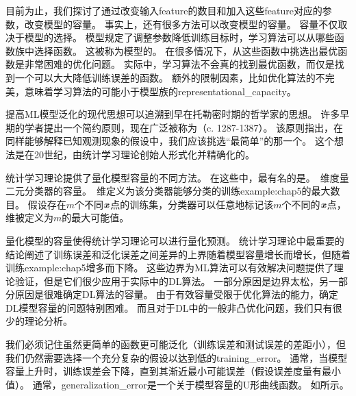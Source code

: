 
目前为止，我们探讨了通过改变输入\gls{feature}的数目和加入这些\gls{feature}对应的参数，改变模型的容量。
事实上，还有很多方法可以改变模型的容量。
容量不仅取决于模型的选择。
模型规定了调整参数降低训练目标时，学习算法可以从哪些函数族中选择函数。
这被称为模型的。
在很多情况下，从这些函数中挑选出最优函数是非常困难的优化问题。
实际中，学习算法不会真的找到最优函数，而仅是找到一个可以大大降低训练误差的函数。
额外的限制因素，比如优化算法的不完美，意味着学习算法的可能小于模型族的\gls{representational_capacity}。


提高\gls{ML}模型泛化的现代思想可以追溯到早在托勒密时期的哲学家的思想。
许多早期的学者提出一个简约原则，现在广泛被称为（c. 1287-1387）。
该原则指出，在同样能够解释已知观测现象的假设中，我们应该挑选``最简单''的那一个。
这个想法是在20世纪，由统计学习理论创始人形式化并精确化的\citep{Vapnik71,Vapnik82,Blumer-et-al-1989,Vapnik95}。

统计学习理论提供了量化模型容量的不同方法。
在这些中，最有名的是。
\,维度量二元分类器的容量。
\,维定义为该分类器能够分类的训练\gls{example:chap5}的最大数目。
假设存在$m$个不同$\boldsymbol{\mathit{x}}$点的训练集，分类器可以任意地标记该$m$个不同的$\boldsymbol{\mathit{x}}$点，\,维被定义为$m$的最大可能值。

量化模型的容量使得统计学习理论可以进行量化预测。
统计学习理论中最重要的结论阐述了训练误差和泛化误差之间差异的上界随着模型容量增长而增长，但随着训练\gls{example:chap5}增多而下降\citep{Vapnik71,Vapnik82,Blumer-et-al-1989,Vapnik95}。
这些边界为\gls{ML}算法可以有效解决问题提供了理论验证，但是它们很少应用于实际中的\gls{DL}算法。
一部分原因是边界太松，另一部分原因是很难确定\gls{DL}算法的容量。
由于有效容量受限于优化算法的能力，确定\gls{DL}模型容量的问题特别困难。
而且对于\gls{DL}中的一般非凸优化问题，我们只有很少的理论分析。

我们必须记住虽然更简单的函数更可能泛化（训练误差和测试误差的差距小），但我们仍然需要选择一个充分复杂的假设以达到低的\gls{training_error}。
通常，当模型容量上升时，训练误差会下降，直到其渐近最小可能误差（假设误差度量有最小值）。
通常，\gls{generalization_error}是一个关于模型容量的U形曲线函数。
如所示。

